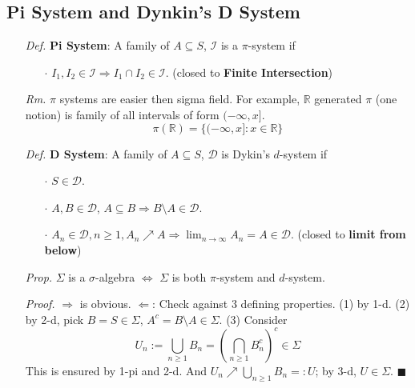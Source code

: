 \documentclass[a4paper,12pt,twoside]{book}
\begin{document}
\subsection{Pi System and Dynkin's D System}
\begin{itemize}
	\item[\textit{Def.}] \textbf{Pi System}: A family of $A \subseteq S$, $\mathcal{I}$ is a $\pi$-system if
	\begin{itemize}
		\item[$\cdot$] $I_1, I_2 \in \mathcal{I} \Rightarrow I_1 \cap I_2 \in \mathcal{I}$. (closed to \textbf{Finite Intersection})
	\end{itemize}

	\item[\textit{Rm.}] $\pi$ systems are easier then sigma field. For example, $\mathbb{R}$ generated $\pi$ (one notion) is family of all intervals of form $(-\infty,x]$.
	\begin{equation}
		\pi(\mathbb{R})=\{(-\infty,x]: x\in \mathbb{R}\}
	\end{equation}

	\item[\textit{Def.}] \textbf{D System}: A family of $A \subseteq S$, $\mathcal{D}$ is Dykin's $d$-system if
	\begin{itemize}
		\item[$\cdot$] $S \in \mathcal{D}$.
		\item[$\cdot$] $A,B \in \mathcal{D}$, $A \subseteq B \Rightarrow B \setminus A \in \mathcal{D}$.
		\item[$\cdot$] $A_n \in \mathcal{D}, n \geq 1, A_n \nearrow A \Rightarrow \lim_{n \to \infty}A_n = A \in \mathcal{D}$. (closed to \textbf{limit from below})
	\end{itemize}

	\item[\textit{Prop.}] $\Sigma$ is a $\sigma$-algebra $\iff$ $\Sigma$ is both $\pi$-system and $d$-system. 

	\item[\textit{Proof.}] $\Rightarrow$ is obvious.\newline
	$\Leftarrow$: Check against 3 defining properties. (1) by 1-d. (2) by 2-d, pick $B=S\in \Sigma$, $A^c=B\setminus A\in \Sigma$. (3) Consider 
	\begin{equation}
		U_n:=\bigcup_{n\geq 1}B_n=(\bigcap_{n\geq 1}B_n^c)^c \in \Sigma
	\end{equation}
	This is ensured by 1-pi and 2-d. And $U_n\nearrow \bigcup_{n\geq 1}B_n=:U$; by 3-d, $U\in\Sigma$. $\blacksquare$
\end{itemize}
\end{document}
